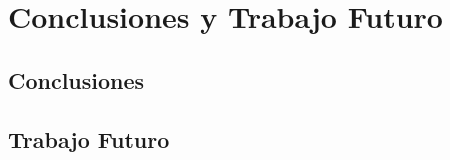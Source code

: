 
\chapter{Conclusiones y Trabajo Futuro} %
\label{Chapter8}


\section{Conclusiones}
\section{Trabajo Futuro}
